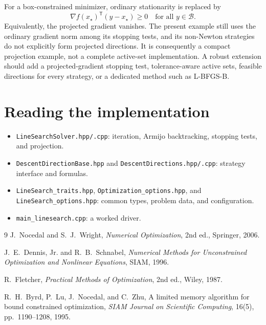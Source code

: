 \documentclass[11pt,a4paper]{article}
\newcommand{\grad}{\nabla}
\newcommand{\trans}{\mathsf{T}}
\begin{document}
For a box-constrained minimizer, ordinary stationarity is replaced by
\begin{equation}
 \grad f(x_\star)^\trans(y-x_\star)\geq0
 \quad\text{for all }y\in\mathcal B.
 \label{eq:box-stationarity}
\end{equation}
Equivalently, the projected gradient vanishes. The present example still uses
the ordinary gradient norm among its stopping tests, and its non-Newton
strategies do not explicitly form projected directions. It is consequently a
compact projection example, not a complete active-set implementation. A robust
extension should add a projected-gradient stopping test, tolerance-aware active
sets, feasible directions for every strategy, or a dedicated method such as
L-BFGS-B.

\section{Reading the implementation}

\begin{itemize}
\item \texttt{LineSearchSolver.hpp/.cpp}: iteration, Armijo backtracking,
      stopping tests, and projection.
\item \texttt{DescentDirectionBase.hpp} and
      \texttt{DescentDirections.hpp/.cpp}: strategy interface and formulas.
\item \texttt{LineSearch\_traits.hpp}, \texttt{Optimization\_options.hpp}, and
      \texttt{LineSearch\_options.hpp}: common types, problem data, and
      configuration.
\item \texttt{main\_linesearch.cpp}: a worked driver.
\end{itemize}

\begin{thebibliography}{9}
J.~Nocedal and S.~J.~Wright, \emph{Numerical Optimization}, 2nd ed.,
Springer, 2006.

J.~E.~Dennis, Jr. and R.~B.~Schnabel,
\emph{Numerical Methods for Unconstrained Optimization and Nonlinear
Equations}, SIAM, 1996.

R.~Fletcher, \emph{Practical Methods of Optimization}, 2nd ed., Wiley, 1987.

R.~H.~Byrd, P.~Lu, J.~Nocedal, and C.~Zhu,
A limited memory algorithm for bound constrained optimization,
\emph{SIAM Journal on Scientific Computing}, 16(5), pp.~1190--1208, 1995.
\end{thebibliography}
\end{document}
